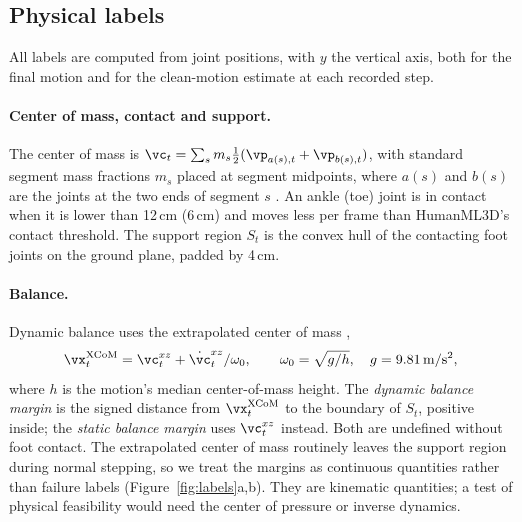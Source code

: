 \subsection{Physical labels}
\label{sec:labels}
All labels are computed from joint positions, with $y$ the vertical axis, both for the final motion and for the clean-motion estimate at each recorded step.

\paragraph{Center of mass, contact and support.} The center of mass is $\vc_t = \sum_s m_s \tfrac12(\vp_{a(s),t} + \vp_{b(s),t})$, with standard segment mass fractions $m_s$ placed at segment midpoints, where $a(s)$ and $b(s)$ are the joints at the two ends of segment $s$ \citep{winter2009biomechanics}. An ankle (toe) joint is in contact when it is lower than 12\,cm (6\,cm) and moves less per frame than HumanML3D's contact threshold. The support region $S_t$ is the convex hull of the contacting foot joints on the ground plane, padded by 4\,cm.

\paragraph{Balance.} Dynamic balance uses the extrapolated center of mass \citep{hof2005condition},
\begin{equation}
    \vx^{\mathrm{XCoM}}_t = \vc^{xz}_t + \dot{\vc}^{xz}_t / \omega_0, \qquad \omega_0 = \sqrt{g/h}, \quad g = 9.81\,\mathrm{m/s^2},
\end{equation}
where $h$ is the motion's median center-of-mass height. The \emph{dynamic balance margin} is the signed distance from $\vx^{\mathrm{XCoM}}_t$ to the boundary of $S_t$, positive inside; the \emph{static balance margin} uses $\vc^{xz}_t$ instead. Both are undefined without foot contact. The extrapolated center of mass routinely leaves the support region during normal stepping, so we treat the margins as continuous quantities rather than failure labels (Figure~\ref{fig:labels}a,b). They are kinematic quantities; a test of physical feasibility would need the center of pressure or inverse dynamics.

